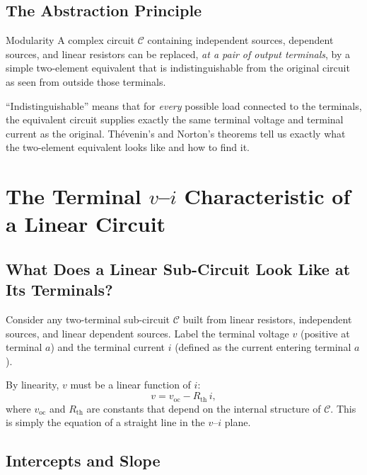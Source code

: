 \documentclass[twoside]{article}
\begin{document}
\subsection{The Abstraction Principle}

\begin{orangebox}{Modularity}
A complex circuit $\mathcal{C}$ containing independent sources, dependent sources, and linear resistors can be replaced, \emph{at a pair of output terminals}, by a simple two-element equivalent that is indistinguishable from the original circuit as seen from outside those terminals.
\end{orangebox}

``Indistinguishable'' means that for \emph{every} possible load connected to the terminals, the equivalent circuit supplies exactly the same terminal voltage and terminal current as the original.  Th\'{e}venin's and Norton's theorems tell us exactly what the two-element equivalent looks like and how to find it.

\section{The Terminal \texorpdfstring{$v$--$i$}{v-i} Characteristic of a Linear Circuit}

\subsection{What Does a Linear Sub-Circuit Look Like at Its Terminals?}

Consider any two-terminal sub-circuit $\mathcal{C}$ built from linear resistors, independent sources, and linear dependent sources.  Label the terminal voltage $v$ (positive at terminal $a$) and the terminal current $i$ (defined as the current entering terminal $a$).

By linearity, $v$ must be a linear function of $i$:
\[
    v = v_{\text{oc}} - R_{\text{th}}\,i,
\]
where $v_{\text{oc}}$ and $R_{\text{th}}$ are constants that depend on the internal structure of $\mathcal{C}$.  This is simply the equation of a straight line in the $v$--$i$ plane.

\subsection{Intercepts and Slope}
\end{document}
